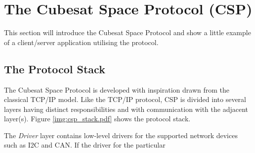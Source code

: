 \chapter{The Cubesat Space Protocol (CSP)}
\label{chapter:csp}
This section will introduce the Cubesat Space Protocol and show a little example of a client/server application utilising the protocol. 

\section{The Protocol Stack}
The Cubesat Space Protocol is developed with inspiration drawn from the classical TCP/IP model. Like the TCP/IP protocol, CSP is divided into several layers having distinct responsibilities and with communication with the adjacent layer(s). Figure \ref{img:csp_stack.pdf} shows the protocol stack.


The \textit{Driver} layer contains low-level drivers for the supported network devices such as I2C and CAN. If the driver for the particular 